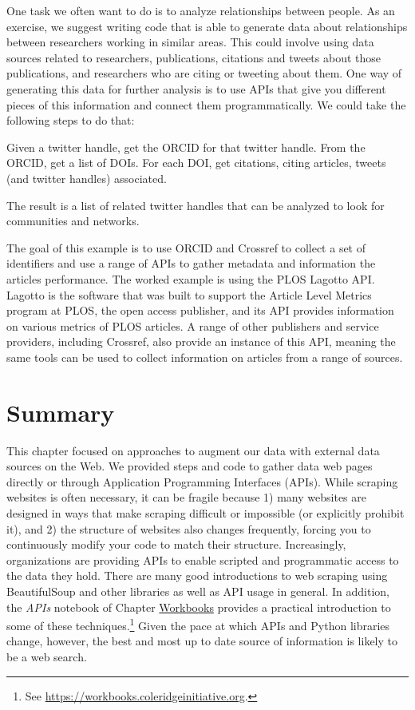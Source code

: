 \documentclass[]{krantz}
\begin{document}
One task we often want to do is to analyze relationships between people.
As an exercise, we suggest writing code that is able to generate data
about relationships between researchers working in similar areas. This
could involve using data sources related to researchers, publications,
citations and tweets about those publications, and researchers who are
citing or tweeting about them. One way of generating this data for
further analysis is to use APIs that give you different pieces of this
information and connect them programmatically. We could take the
following steps to do that:

Given a twitter handle, get the ORCID for that twitter handle. From the
ORCID, get a list of DOIs. For each DOI, get citations, citing articles,
tweets (and twitter handles) associated.

The result is a list of related twitter handles that can be analyzed to
look for communities and networks.

The goal of this example is to use ORCID and Crossref to collect a set
of identifiers and use a range of APIs to gather metadata and
information the articles performance. The worked example is using the
PLOS Lagotto API. Lagotto is the software that was built to support the
Article Level Metrics program at PLOS, the open access publisher, and
its API provides information on various metrics of PLOS articles. A
range of other publishers and service providers, including Crossref,
also provide an instance of this API, meaning the same tools can be used
to collect information on articles from a range of sources.

\section{Summary}\label{summary}

This chapter focused on approaches to augment our data with external
data sources on the Web. We provided steps and code to gather data web
pages directly or through Application Programming Interfaces (APIs).
While scraping websites is often necessary, it can be fragile because 1)
many websites are designed in ways that make scraping difficult or
impossible (or explicitly prohibit it), and 2) the structure of websites
also changes frequently, forcing you to continuously modify your code to
match their structure. Increasingly, organizations are providing APIs to
enable scripted and programmatic access to the data they hold. There are
many good introductions to web scraping using BeautifulSoup and other
libraries as well as API usage in general. In addition, the \emph{APIs}
notebook of Chapter \protect\hyperlink{chap:workbooks}{Workbooks}
provides a practical introduction to some of these techniques.\footnote{See
  \url{https://workbooks.coleridgeinitiative.org}.} Given the pace at
which APIs and Python libraries change, however, the best and most up to
date source of information is likely to be a web search.
\end{document}
